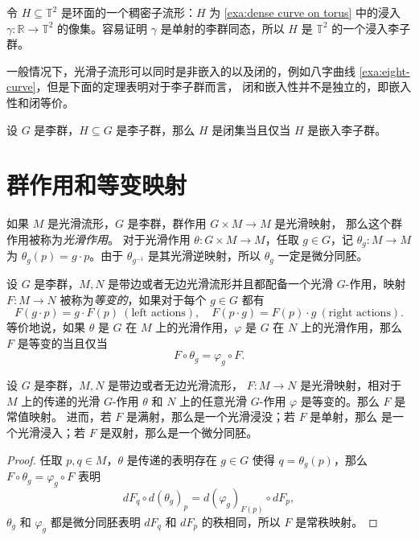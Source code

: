 \begin{example}[环面的稠密李子群]
  令 $H\subseteq \mathbb{T}^2$ 是环面的一个稠密子流形：$H$ 为
  \autoref{exa:dense curve on torus} 中的浸入 $\gamma:\mathbb{R}\to \mathbb{T}^2$
  的像集。容易证明 $\gamma$ 是单射的李群同态，所以 $H$ 是 $\mathbb T^2$
  的一个浸入李子群。
\end{example}

一般情况下，光滑子流形可以同时是非嵌入的以及闭的，例如八字曲线
\ref{exa:eight-curve}，但是下面的定理表明对于李子群而言，
闭和嵌入性并不是独立的，即嵌入性和闭等价。

\begin{theorem}
  设 $G$ 是李群，$H\subseteq G$ 是李子群，那么 $H$ 是闭集当且仅当
  $H$ 是嵌入李子群。
\end{theorem}

\section{群作用和等变映射}

如果 $M$ 是光滑流形，$G$ 是李群，群作用 $G\times M\to M$ 是光滑映射，
那么这个群作用被称为\emph{光滑作用}。
对于光滑作用 $\theta:G\times M\to M$，任取 $g\in G$，记 
$\theta_g:M\to M$ 为 $\theta_g(p)=g\cdot p$。由于 $\theta_{g^{-1}}$
是其光滑逆映射，所以 $\theta_g$ 一定是微分同胚。

设 $G$ 是李群，$M,N$ 是带边或者无边光滑流形并且都配备一个光滑
$G$-作用，映射 $F:M\to N$ 被称为\emph{等变的}，如果对于每个 $g\in G$
都有
\[
  F(g\cdot p)=g\cdot F(p) \ (\text{left actions})  ,\quad
  F(p\cdot g)=F(p)\cdot g \ (\text{right actions})  .
\]
等价地说，如果 $\theta$ 是 $G$ 在 $M$ 上的光滑作用，$\varphi$
是 $G$ 在 $N$ 上的光滑作用，那么 $F$ 是等变的当且仅当
\[
  F\circ \theta_g=\varphi_g\circ F.  
\]

\begin{theorem}[等变秩定理]
  设 $G$ 是李群，$M,N$ 是带边或者无边光滑流形，
  $F:M\to N$ 是光滑映射，相对于 $M$ 上的传递的光滑 $G$-作用 $\theta$ 和
  $N$ 上的任意光滑 $G$-作用 $\varphi$ 是等变的。那么 $F$ 是常值映射。
  进而，若 $F$ 是满射，那么是一个光滑浸没；若 $F$ 是单射，那么
  是一个光滑浸入；若 $F$ 是双射，那么是一个微分同胚。
\end{theorem}
\begin{proof}
  任取 $p,q\in M$，$\theta$ 是传递的表明存在 $g\in G$ 使得
  $q=\theta_g(p)$，那么 $F\circ\theta_g=\varphi_g\circ F$ 表明
  \[
    dF_{q}\circ d(\theta_g)_p=d(\varphi_g)_{F(p)}\circ dF_p,  
  \]
  $\theta_g$ 和 $\varphi_g$ 都是微分同胚表明 $dF_q$ 和 $dF_p$
  的秩相同，所以 $F$ 是常秩映射。
\end{proof}

